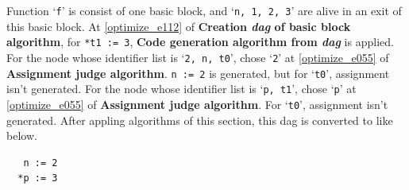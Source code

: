 \begin{Example}
Function `{\tt{f}}' is consist of one basic block, and 
`{\tt{n, 1, 2, 3}}' are alive in an exit of this basic block.
At \ref{optimize_e112} of {\bf Creation {\em dag} of basic block algorithm},
for {\tt{*t1 := 3}},
{\bf Code generation algorithm from {\em dag}} is applied.
For the node whose identifier list is `{\tt{2, n, t0}}',
chose `{\tt{2}}'
at \ref{optimize_e055} of {\bf Assignment judge algorithm}.
{\tt{n := 2}} is generated, but for `{\tt{t0}}', 
assignment isn't generated.
For the node whose identifier list is `{\tt{p, t1}}',
chose `{\tt{p}}'
at \ref{optimize_e055} of {\bf Assignment judge algorithm}.
For `{\tt{t0}}', 
assignment isn't generated. 
After appling algorithms of this section,
this dag is converted to like below.
\begin{verbatim}
   n := 2
  *p := 3
\end{verbatim}
\end{Example}

